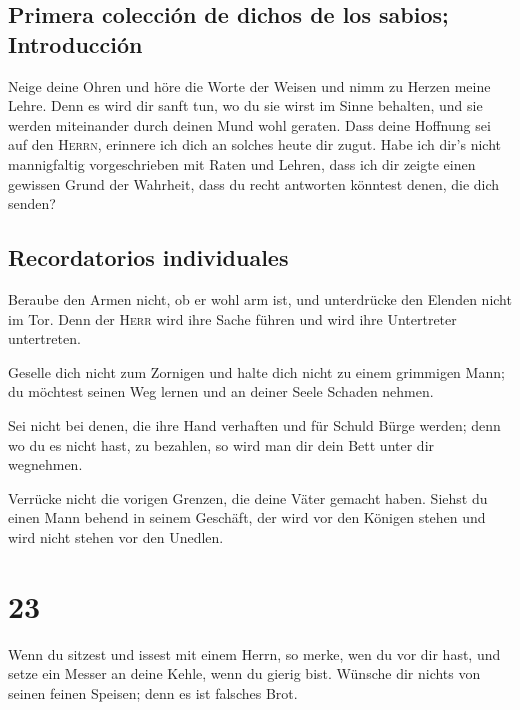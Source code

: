 \hypertarget{primera-colecciuxf3n-de-dichos-de-los-sabios-introducciuxf3n}{%
\subsection{Primera colección de dichos de los sabios;
Introducción}\label{primera-colecciuxf3n-de-dichos-de-los-sabios-introducciuxf3n}}

 Neige deine Ohren und höre die Worte der Weisen und nimm
zu Herzen meine Lehre.  Denn es wird dir sanft tun, wo du
sie wirst im Sinne behalten, und sie werden miteinander durch deinen
Mund wohl geraten.  Dass deine Hoffnung sei auf den
\textsc{Herrn}, erinnere ich dich an solches heute dir zugut.
 Habe ich dir's nicht mannigfaltig vorgeschrieben mit
Raten und Lehren,  dass ich dir zeigte einen gewissen
Grund der Wahrheit, dass du recht antworten könntest denen, die dich
senden?

\hypertarget{recordatorios-individuales}{%
\subsection{Recordatorios
individuales}\label{recordatorios-individuales}}

 Beraube den Armen nicht, ob er wohl arm ist, und
unterdrücke den Elenden nicht im Tor.  Denn der
\textsc{Herr} wird ihre Sache führen und wird ihre Untertreter
untertreten.

 Geselle dich nicht zum Zornigen und halte dich nicht zu
einem grimmigen Mann;  du möchtest seinen Weg lernen und
an deiner Seele Schaden nehmen.

 Sei nicht bei denen, die ihre Hand verhaften und für
Schuld Bürge werden;  denn wo du es nicht hast, zu
bezahlen, so wird man dir dein Bett unter dir wegnehmen.

 Verrücke nicht die vorigen Grenzen, die deine Väter
gemacht haben.  Siehst du einen Mann behend in seinem
Geschäft, der wird vor den Königen stehen und wird nicht stehen vor den
Unedlen.

\hypertarget{section-22}{%
\section{23}\label{section-22}}

 Wenn du sitzest und issest mit einem Herrn, so merke, wen
du vor dir hast,  und setze ein Messer an deine Kehle,
wenn du gierig bist.  Wünsche dir nichts von seinen feinen
Speisen; denn es ist falsches Brot.

